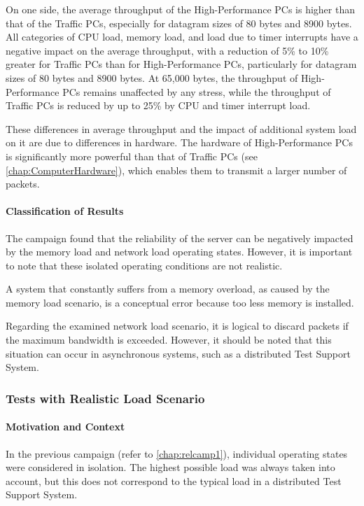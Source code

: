 On one side, the average throughput of the High-Performance PCs is higher than that of the Traffic PCs, especially for datagram sizes of 80 bytes and 8900 bytes. All categories of CPU load, memory load, and load due to timer interrupts have a negative impact on the average throughput, with a reduction of 5\% to 10\% greater for Traffic PCs than for High-Performance PCs, particularly for datagram sizes of 80 bytes and 8900 bytes.  At 65,000 bytes, the throughput of High-Performance PCs remains unaffected by any stress, while the throughput of Traffic PCs is reduced by up to 25\% by CPU and timer interrupt load.

These differences in average throughput and the impact of additional system load on it are due to differences in hardware. The hardware of High-Performance PCs is significantly more powerful than that of Traffic PCs (see \ref{chap:ComputerHardware}), which enables them to transmit a larger number of packets.

\paragraph{Classification of Results}
The campaign found that the reliability of the server can be negatively impacted by the memory load and network load operating states. However, it is important to note that these isolated operating conditions are not realistic.

A system that constantly suffers from a memory overload, as caused by the memory load scenario, is a conceptual error because too less memory is installed.

Regarding the examined network load scenario, it is logical to discard packets if the maximum bandwidth is exceeded. However, it should be noted that this situation can occur in asynchronous systems, such as a distributed Test Support System.

\subsubsection{Tests with Realistic Load Scenario} \label{chap:campaignloadscen}
\paragraph{Motivation and Context}
In the previous campaign (refer to \ref{chap:relcamp1}), individual operating states were considered in isolation. The highest possible load was always taken into account, but this does not correspond to the typical load in a distributed Test Support System.

